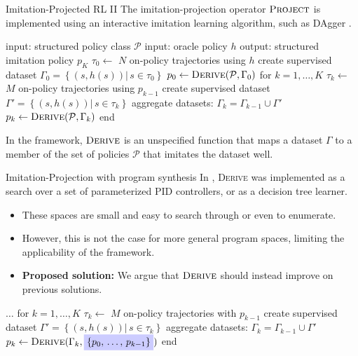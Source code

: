 \begin{frame}[fragile]{Imitation-Projected RL II}
The imitation-projection operator $\textsc{Project}$ is implemented using an interactive imitation learning algorithm, such as DAgger \citep{ross2011reduction}.

\begin{algorithm}[caption={$\textsc{Project}$: imitation learning}]
 input: structured policy class $\mathcal{P}$
 input: oracle policy $h$
 output: structured imitation policy $p_K$
 $\tau_0 \leftarrow $ $N$ on-policy trajectories using $h$
 create supervised dataset $\Gamma_0 = \left\{\left(s, h(s)\right) |\, s \in \tau_0 \right\}$
 $p_0 \leftarrow \textsc{Derive}(\mathcal{P}, \Gamma_0)$
 for $k = 1, \dots, K$
   $\tau_k \leftarrow $ $M$ on-policy trajectories using $p_{k-1}$
   create supervised dataset $\Gamma' = \left\{\left(s, h(s)\right) |\, s \in \tau_k \right\}$
   aggregate datasets: $\Gamma_k = \Gamma_{k-1} \cup \Gamma' \quad$
   $p_k \leftarrow \textsc{Derive}(\mathcal{P}, \Gamma_k)$
 end
\end{algorithm}

In the framework, $\textsc{Derive}$ is an unspecified function that maps a dataset $\Gamma$ to a member of the set of policies $\mathcal{P}$ that imitates the dataset well.


\end{frame}




\begin{frame}[fragile]{Imitation-Projection with program synthesis}
In \citet{Verma_Le_Yue_Chaudhuri_2019}, \textsc{Derive} was implemented as a search over a set of parameterized PID controllers, or as a decision tree learner.

\begin{itemize}
    \item These spaces are small and easy to search through or even to enumerate.
    \item However, this is not the case for more general program spaces, limiting the applicability of the framework.
    \item \textbf{Proposed solution:} We argue that $\textsc{Derive}$ should instead improve on previous solutions.
\end{itemize}

\begin{algorithm}[caption={$\textsc{Project}$: imitation learning by improvement}]
 $\dots$
 for $k = 1, \dots, K$
   $\tau_k \leftarrow $ $M$ on-policy trajectories with $p_{k-1}$
   create supervised dataset $\Gamma' = \left\{\left(s, h(s)\right) |\, s \in \tau_k \right\}$
   aggregate datasets: $\Gamma_k = \Gamma_{k-1} \cup \Gamma' \quad$
   $p_k \leftarrow \textsc{Derive}(\Gamma_k, \highlight{\{p_0,\,\dots,\,p_{k-1}\}})$
 end
\end{algorithm}
\end{frame}

